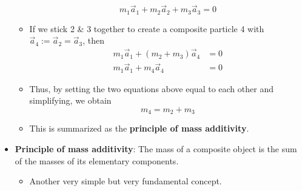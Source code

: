 \documentclass[../notes.tex]{subfiles}
\begin{document}
\begin{itemize}
\begin{itemize}
        \begin{equation*}
            m_1\vec{a}_1+m_2\vec{a}_2+m_3\vec{a}_3 = 0
        \end{equation*}
        \item If we stick 2 \& 3 together to create a composite particle 4 with $\vec{a}_4:=\vec{a}_2=\vec{a}_3$, then
        \begin{align*}
            m_1\vec{a}_1+(m_2+m_3)\vec{a}_4 &= 0\\
            m_1\vec{a}_1+m_4\vec{a}_4 &= 0
        \end{align*}
        \item Thus, by setting the two equations above equal to each other and simplifying, we obtain
        \begin{equation*}
            m_4 = m_2+m_3
        \end{equation*}
        \item This is summarized as the \textbf{principle of mass additivity}.
    \end{itemize}
    \item \textbf{Principle of mass additivity}: The mass of a composite object is the sum of the masses of its elementary components.
    \begin{itemize}
        \item Another very simple but very fundamental concept.
    \end{itemize}
\end{itemize}
\end{document}
